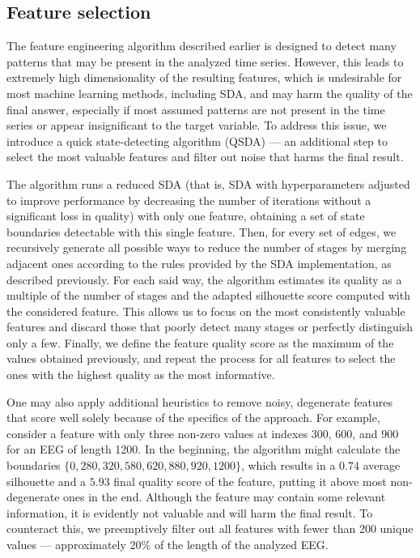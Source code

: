 \documentclass[journal,twoside,web]{ieeecolor2}
\begin{document}
\subsection{Feature selection}

The feature engineering algorithm described earlier is designed to detect many patterns that may be present in the analyzed time series. However, this leads to extremely high dimensionality of the resulting features, which is undesirable for most machine learning methods, including SDA, and may harm the quality of the final answer, especially if most assumed patterns are not present in the time series or appear insignificant to the target variable. To address this issue, we introduce a quick state-detecting algorithm (QSDA) --- an additional step to select the most valuable features and filter out noise that harms the final result. 

The algorithm runs a reduced SDA (that is, SDA with hyperparameters adjusted to improve performance by decreasing the number of iterations without a significant loss in quality) with only one feature, obtaining a set of state boundaries detectable with this single feature. Then, for every set of edges, we recursively generate all possible ways to reduce the number of stages by merging adjacent ones according to the rules provided by the SDA implementation, as described previously. For each said way, the algorithm estimates its quality as a multiple of the number of stages and the adapted silhouette score computed with the considered feature. This allows us to focus on the most consistently valuable features and discard those that poorly detect many stages or perfectly distinguish only a few. Finally, we define the feature quality score as the maximum of the values obtained previously, and repeat the process for all features to select the ones with the highest quality as the most informative.

One may also apply additional heuristics to remove noisy, degenerate features that score well solely because of the specifics of the approach. For example, consider a feature with only three non-zero values at indexes 300, 600, and 900 for an EEG of length 1200. In the beginning, the algorithm might calculate the boundaries $\{ 0, 280, 320, 580, 620, 880, 920, 1200 \}$, which results in a $0.74$ average silhouette and a $5.93$ final quality score of the feature, putting it above most non-degenerate ones in the end. Although the feature may contain some relevant information, it is evidently not valuable and will harm the final result. To counteract this, we preemptively filter out all features with fewer than 200 unique values --- approximately 20\% of the length of the analyzed EEG.\@
\end{document}

